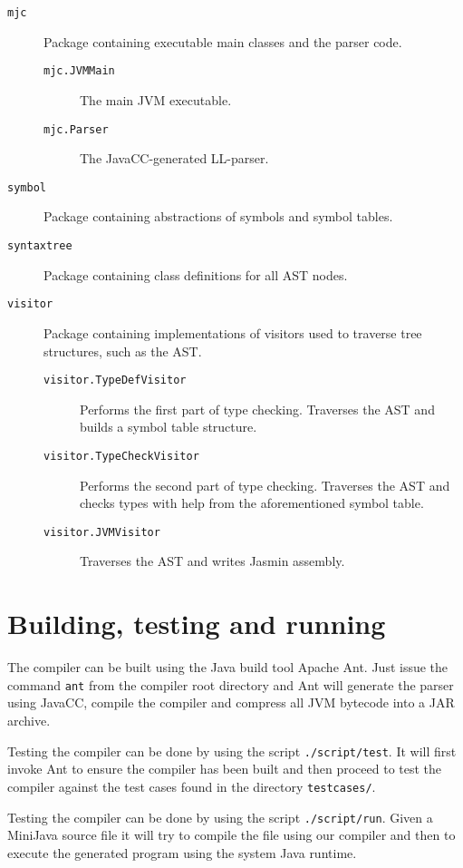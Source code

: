 \documentclass[a4paper]{article}
\begin{document}
\begin{description}
\item[\texttt{mjc}] Package containing executable main classes and the parser
    code.
    \begin{description}
        \item[\texttt{mjc.JVMMain}] The main JVM executable.
        \item[\texttt{mjc.Parser}] The JavaCC-generated LL-parser.
    \end{description}
\item[\texttt{symbol}] Package containing abstractions of symbols and symbol
    tables.
\item[\texttt{syntaxtree}] Package containing class definitions for all AST
    nodes.
\item[\texttt{visitor}] Package containing implementations of visitors used to
    traverse tree structures, such as the AST.
    \begin{description}
        \item[\texttt{visitor.TypeDefVisitor}] Performs the first part of type
            checking. Traverses the AST and builds a symbol table structure.
        \item[\texttt{visitor.TypeCheckVisitor}] Performs the second part of
            type checking. Traverses the AST and checks types with help from the
            aforementioned symbol table.
        \item[\texttt{visitor.JVMVisitor}] Traverses the AST and writes Jasmin
            assembly.
    \end{description}
\end{description}

\section{Building, testing and running}

The compiler can be built using the Java build tool Apache Ant\texttrademark.
Just issue the command \texttt{ant} from the compiler root directory and Ant
will generate the parser using JavaCC, compile the compiler and compress all JVM
bytecode into a JAR archive.

Testing the compiler can be done by using the script \texttt{./script/test}. It
will first invoke Ant to ensure the compiler has been built and then proceed to
test the compiler against the test cases found in the directory
\texttt{testcases/}.

Testing the compiler can be done by using the script \texttt{./script/run}.
Given a MiniJava source file it will try to compile the file using our compiler
and then to execute the generated program using the system Java runtime.
\end{document}

